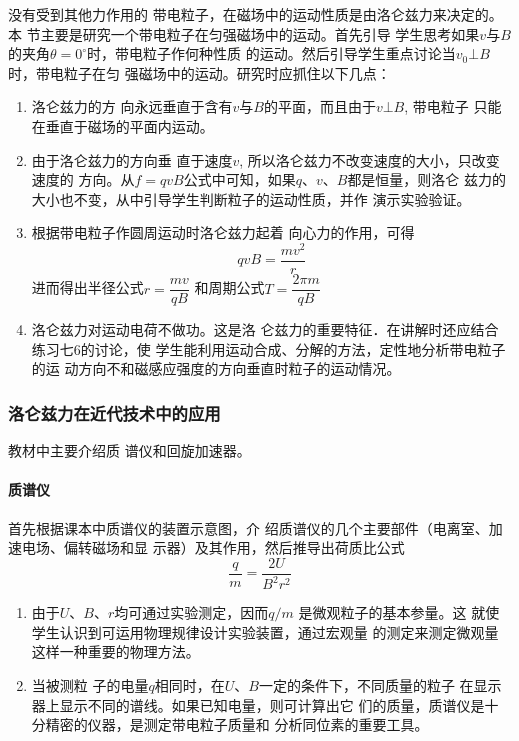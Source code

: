 没有受到其他力作用的
带电粒子，在磁场中的运动性质是由洛仑兹力来决定的。本
节主要是研究一个带电粒子在匀强磁场中的运动。首先引导
学生思考如果$v$与$B$的夹角$\theta=0^{\circ}$时，带电粒子作何种性质
的运动。然后引导学生重点讨论当$v_0\bot B$时，带电粒子在匀
强磁场中的运动。研究时应抓住以下几点：
\begin{enumerate}
\item 洛仑兹力的方
向永远垂直于含有$v$与$B$的平面，而且由于$v\bot B$, 带电粒子
只能在垂直于磁场的平面内运动。    
\item 由于洛仑兹力的方向垂
直于速度$v$, 所以洛仑兹力不改变速度的大小，只改变速度的
方向。从$f=qvB$公式中可知，如果$q$、$v$、$B$都是恒量，则洛仑
兹力的大小也不变，从中引导学生判断粒子的运动性质，并作
演示实验验证。    
\item 根据带电粒子作圆周运动时洛仑兹力起着
向心力的作用，可得 
\[qvB=\frac{mv^2}{r}\]
进而得出半径公式$r=\dfrac{mv}{qB}$
和周期公式$T=\dfrac{2\pi m}{qB}$
\item 洛仑兹力对运动电荷不做功。这是洛
仑兹力的重要特征．在讲解时还应结合练习七6的讨论，使
学生能利用运动合成、分解的方法，定性地分析带电粒子的运
动方向不和磁感应强度的方向垂直时粒子的运动情况。
\end{enumerate}



\subsubsection{洛仑兹力在近代技术中的应用}

教材中主要介绍质
谱仪和回旋加速器。

\paragraph{质谱仪} 
首先根据课本中质谱仪的装置示意图，介
绍质谱仪的几个主要部件（电离室、加速电场、偏转磁场和显
示器）及其作用，然后推导出荷质比公式
\[\frac{q}{m}=\frac{2U}{B^2r^2}\]

\begin{enumerate}
\item 由于$U$、$B$、$r$均可通过实验测定，因而$q/m$
是微观粒子的基本参量。这
就使学生认识到可运用物理规律设计实验装置，通过宏观量
的测定来测定微观量这样一种重要的物理方法。    
\item 当被测粒
子的电量$q$相同时，在$U$、$B$一定的条件下，不同质量的粒子
在显示器上显示不同的谱线。如果已知电量，则可计算出它
们的质量，质谱仪是十分精密的仪器，是测定带电粒子质量和
分析同位素的重要工具。
\end{enumerate}

